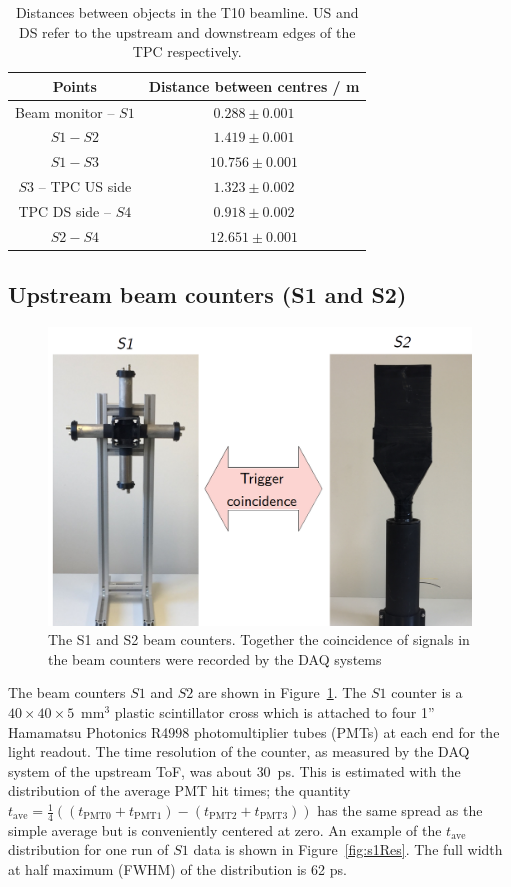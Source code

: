 \begin{table}
  \centering
  \caption{Distances between objects in the T10 beamline. US and DS refer to the upstream and downstream edges of the TPC respectively.}
  \begin{tabular}{c|c}
    \hline
    \hline
    Points & Distance between centres / m\\
    \hline
    Beam monitor -- $\mathit{S1}$ & $0.288 \pm 0.001$ \\
    $\mathit{S1}-\mathit{S2}$ & $1.419 \pm 0.001$ \\
    $\mathit{S1}-\mathit{S3}$ & $10.756 \pm 0.001$ \\
    $\mathit{S3}$ -- TPC US side & $1.323 \pm 0.002$ \\
    TPC DS side -- $\mathit{S4}$ & $0.918 \pm 0.002$ \\
    $\mathit{S2}-\mathit{S4}$ & $12.651 \pm 0.001$ \\
    \hline    
  \end{tabular}
  \label{tab:distances}
\end{table}

\subsection{Upstream beam counters (S1 and S2)}
\label{subsec:s1s2Exp}
\begin{figure}
  \centering
  \includegraphics[width=0.7\linewidth]{files/Figures/S1S2FrontOn.png}
  \caption{The S1 and S2 beam counters. Together the coincidence of signals in the beam counters were recorded by the DAQ systems}
  \label{fig:S1S2headon}
\end{figure}
The beam counters $\mathit{S1}$ and $\mathit{S2}$ are shown in Figure~\ref{fig:S1S2headon}.
The $\mathit{S1}$ counter is a $40\times40\times5$~mm$^3$ plastic scintillator cross which is attached to four 1'' Hamamatsu Photonics R4998 photomultiplier tubes (PMTs) at each end for the light readout.
The time resolution of the counter, as measured by the DAQ system of the upstream ToF, was about 30~ps. This is estimated with the distribution of the average PMT hit times; the quantity $t_{\textrm{ave}}=\frac{1}{4}((t_{\textrm{PMT0}}+t_{\textrm{PMT1}})-(t_{\textrm{PMT2}}+t_{\textrm{PMT3}}))$ has the same spread as the simple average but is conveniently centered at zero.
An example of the $t_{\textrm{ave}}$ distribution for one run of $\mathit{S1}$ data is shown in Figure~\ref{fig:s1Res}. The full width at half maximum (FWHM) of the distribution is 62 ps.

